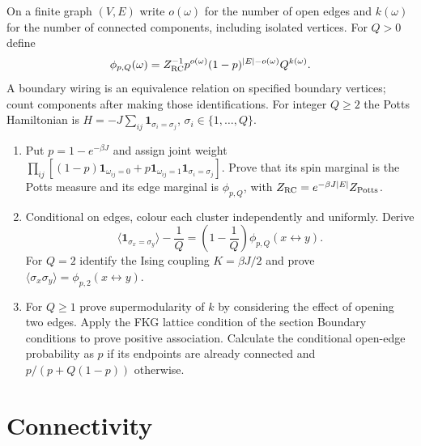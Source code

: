 \begin{exercise}
On a finite graph $(V,E)$ write $o(\omega)$ for the number
of open edges and $k(\omega)$ for the number of connected
components, including isolated vertices. For $Q>0$ define
\[
 \phi_{p,Q}(\omega)=Z_{\rm RC}^{-1}
    p^{o(\omega)}(1-p)^{|E|-o(\omega)}Q^{k(\omega)}.
\]
A boundary wiring is an equivalence relation on specified
boundary vertices; count components after making those
identifications. For integer $Q\ge2$ the Potts Hamiltonian
is $H=-J\sum_{ij}\mathbf1_{\sigma_i=\sigma_j}$,
$\sigma_i\in\{1,\dots,Q\}$.
\begin{enumerate}[label=(\alph*)]
\item Put $p=1-e^{-\beta J}$ and assign joint weight
$\prod_{ij}[(1-p)\mathbf1_{\omega_{ij}=0}
+p\mathbf1_{\omega_{ij}=1}\mathbf1_{\sigma_i=\sigma_j}]$.
Prove that its spin marginal is the Potts measure and its
edge marginal is $\phi_{p,Q}$, with
$Z_{\rm RC}=e^{-\beta J|E|}Z_{\rm Potts}$.
\item Conditional on edges, colour each cluster independently
and uniformly. Derive
\[
 \langle\mathbf1_{\sigma_x=\sigma_y}\rangle-\frac1Q
   =\left(1-\frac1Q\right)\phi_{p,Q}(x\leftrightarrow y).
\]
For $Q=2$ identify the Ising coupling $K=\beta J/2$
and prove $\langle\sigma_x\sigma_y\rangle
=\phi_{p,2}(x\leftrightarrow y)$.
\item For $Q\ge1$ prove supermodularity of $k$ by considering
the effect of opening two edges. Apply the FKG lattice
condition of the section Boundary conditions to prove
positive association. Calculate the conditional open-edge
probability as $p$ if its endpoints are already connected
and $p/(p+Q(1-p))$ otherwise.
\end{enumerate}
\end{exercise}

\section{Connectivity}

